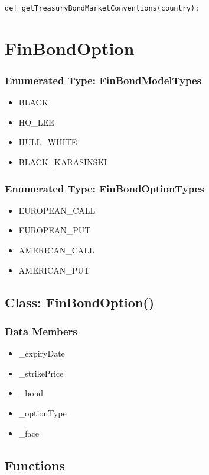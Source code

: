 \documentclass[twoside,11pt]{book}
\begin{document}
\begin{lstlisting}
def getTreasuryBondMarketConventions(country):
\end{lstlisting}

\newpage
\section{FinBondOption}

\subsubsection{Enumerated Type: FinBondModelTypes}
\begin{itemize}
\item{BLACK}
\item{HO\_LEE}
\item{HULL\_WHITE}
\item{BLACK\_KARASINSKI}
\end{itemize}

\subsubsection{Enumerated Type: FinBondOptionTypes}
\begin{itemize}
\item{EUROPEAN\_CALL}
\item{EUROPEAN\_PUT}
\item{AMERICAN\_CALL}
\item{AMERICAN\_PUT}
\end{itemize}

\subsection*{Class: FinBondOption()}


\subsubsection*{Data Members}
\begin{itemize}
\item{\_expiryDate}
\item{\_strikePrice}
\item{\_bond}
\item{\_optionType}
\item{\_face}
\end{itemize}

\subsection*{Functions}
\end{document}
